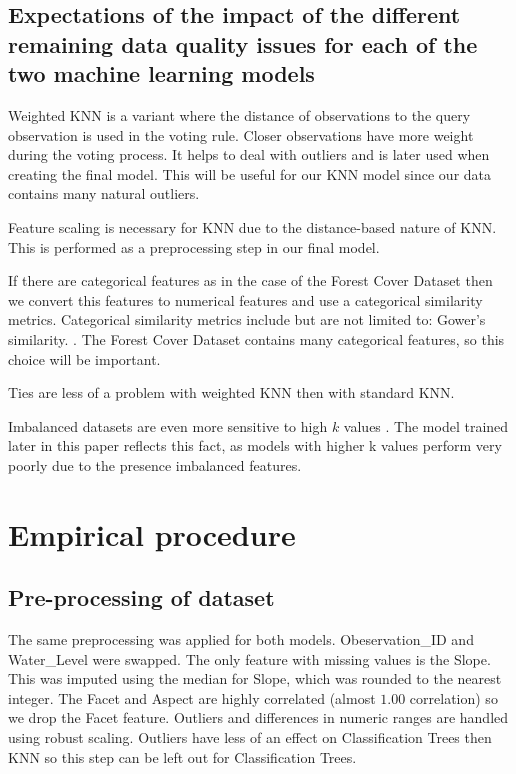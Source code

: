 \documentclass[conference]{IEEEtran}
\begin{document}
\subsection{Expectations of the impact of the different remaining data quality issues for each of the two machine learning models}

Weighted KNN is a variant where the distance of observations to the query observation is used in the voting rule. Closer observations have more weight during the voting process. It helps to deal with outliers and is later used when creating the final model. This will be useful for our KNN model since our data contains many natural outliers.

Feature scaling is necessary for KNN due to the distance-based nature of KNN. This is performed as a preprocessing step in our final model.

If there are categorical features as in the case of the Forest Cover Dataset then we convert this features to numerical features and use a categorical similarity metrics. Categorical similarity metrics include but are not limited to: Gower's similarity. \cite[p.~14-15]{similarity}. The Forest Cover Dataset contains many categorical features, so this choice will be important.

Ties are less of a problem with weighted KNN then with standard KNN.

Imbalanced datasets are even more sensitive to high $k$ values \cite[p.~193]{fundamentals}. The model trained later in this paper reflects this fact, as models with higher k values perform very poorly due to the presence imbalanced features.

\section{Empirical procedure}

\subsection{Pre-processing of dataset}

 The same preprocessing was applied for both models. Obeservation\_ID and Water\_Level were swapped. The only feature with missing values is the Slope. This was imputed using the median for Slope, which was rounded to the nearest integer. The Facet and Aspect are highly correlated (almost $1.00$ correlation) so we drop the Facet feature. Outliers and differences in numeric ranges are handled using robust scaling. Outliers have less of an effect on Classification Trees then KNN so this step can be left out for Classification Trees. 
 
\end{document}
